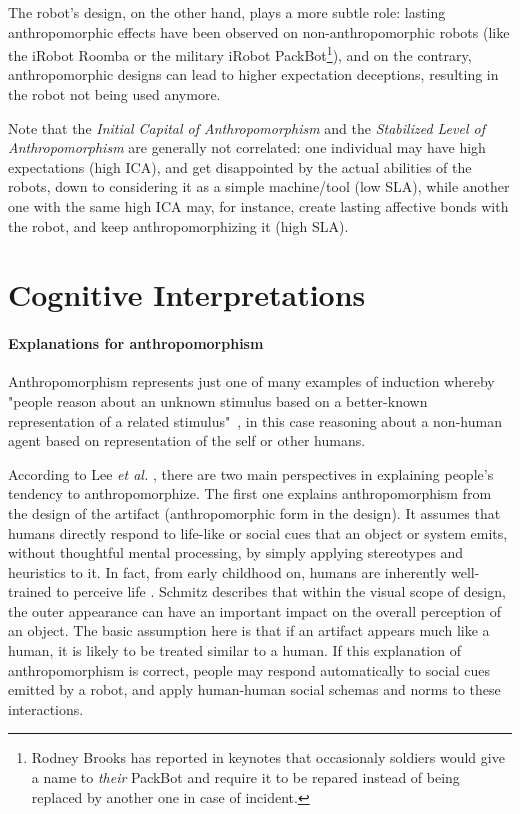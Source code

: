 \documentclass{acm_proc_article-sp}
\begin{document}
The robot's design, on the other hand, plays a more subtle role: lasting
anthropomorphic effects have been observed on non-anthropomorphic robots (like
the iRobot Roomba or the military iRobot PackBot\footnote{Rodney Brooks has
reported in keynotes that occasionaly soldiers would give a name to
\emph{their} PackBot and require it to be repared instead of being replaced by
another one in case of incident.}), and on the contrary, anthropomorphic
designs can lead to higher expectation deceptions, resulting in the robot not
being used anymore.

Note that the \emph{Initial Capital of Anthropomorphism} and the
\emph{Stabilized Level of Anthropomorphism} are generally not correlated: one
individual may have high expectations (high ICA), and get disappointed by the
actual abilities of the robots, down to considering it as a simple machine/tool
(low SLA), while another one with the same high ICA may, for instance, create
lasting affective bonds with the robot, and keep anthropomorphizing it (high
SLA).

\section{Cognitive Interpretations}
\label{sec:cognitivemodel}

\paragraph{Explanations for anthropomorphism}

Anthropomorphism represents just one of many examples of induction whereby
"people reason about an unknown stimulus based on a better-known representation
of a related stimulus"~\cite{epley_when_2008}, in this case reasoning about a
non-human agent based on representation of the self or other humans.

According to Lee \textit{et al.} \cite{lee_human_2005},
there are two main perspectives in explaining people's tendency to
anthropomorphize. The first one explains anthropomorphism from the design of
the artifact (anthropomorphic form in the design). It assumes that humans
directly respond to life-like or social cues that an object or system emits,
without thoughtful mental processing, by simply applying stereotypes and
heuristics to it. In fact, from early childhood on, humans are inherently
well-trained to perceive life \cite{epley_seeing_2007}. Schmitz
\cite{schmitz_concepts_2011} describes that within the visual scope of design,
the outer appearance can have an important impact on the overall perception of
an object. The basic assumption here is that if an artifact appears much like a
human, it is likely to be treated similar to a human. If this explanation of
anthropomorphism is correct, people may respond automatically to social cues
emitted by a robot, and apply human-human social schemas and norms to these
interactions.
\end{document}
